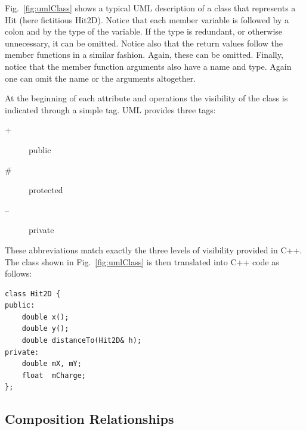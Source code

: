 \documentclass[twoside]{article}
\begin{document}
Fig.~\ref{fig:umlClass} shows a typical UML description of a class
that represents a Hit (here fictitious Hit2D).  Notice that each
member variable is followed by a colon and by the type of the
variable. If the type is redundant, or otherwise unnecessary, it can
be omitted. Notice also that the return values follow the member
functions in a similar fashion. Again, these can be omitted. Finally,
notice that the member function arguments also have a name and type.
Again one can omit the name or the arguments altogether.

At the beginning of each attribute and operations the visibility of
the class is indicated through a simple tag. UML provides three tags:
\begin{description}
\item[+] public
\item[\#] protected
\item[--] private
\end{description}
These abbreviations match exactly the three levels of visibility
provided in C++. The class shown in Fig.~\ref{fig:umlClass} is then
translated into C++ code as follows:

{\footnotesize
\begin{verbatim}
class Hit2D {
public:
    double x();
    double y();
    double distanceTo(Hit2D& h);
private:
    double mX, mY;
    float  mCharge;
};
\end{verbatim}
}%

\subsection{Composition Relationships}
\end{document}

